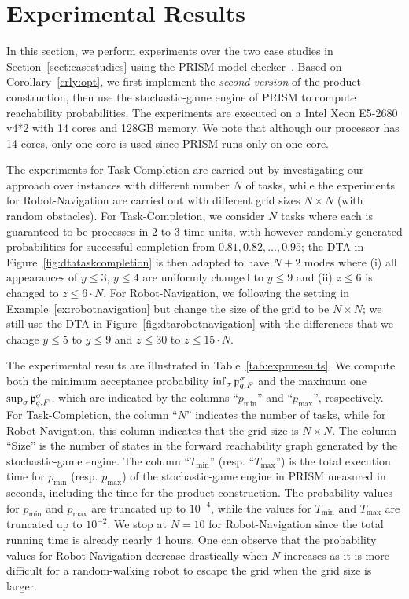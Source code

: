 \vspace{-1.2em}
\section{Experimental Results}
\vspace{-1em}
In this section, we perform experiments over the two case studies in Section~\ref{sect:casestudies} using the PRISM model checker~\cite{DBLP:conf/cav/KwiatkowskaNP11}.
Based on Corollary~\ref{crly:opt}, we first implement the \emph{second version} of the product construction, then use the stochastic-game engine of PRISM to compute reachability probabilities.
The experiments are executed on a Intel Xeon E5-2680 v4*2 with 14 cores and 128GB memory.
We note that although our processor has 14 cores, only one core is used since PRISM runs only on one core.

The experiments for Task-Completion are carried out by investigating our approach over instances with different number $N$ of tasks, while the experiments for Robot-Navigation are carried out with different grid sizes $N\times N$ (with random obstacles).
For Task-Completion, we consider $N$ tasks where each is guaranteed to be processes in $2$ to $3$ time units, with however randomly generated probabilities for successful completion from $0.81,0.82,\dots,0.95$; the DTA in Figure~\ref{fig:dtataskcompletion} is then adapted to have $N+2$ modes where (i) all appearances of $y\le 3$, $y\le 4$ are uniformly changed to $y\le 9$ and (ii) $z\le 6$ is changed to $z\le 6\cdot N$.
For Robot-Navigation, we following the setting in Example~\ref{ex:robotnavigation} but change the size of the grid to be $N\times N$; we still use the DTA in Figure~\ref{fig:dtarobotnavigation} with the differences that we change $y\le 5$ to $y\le 9$ and $z\le 30$ to $z\le 15\cdot N$.

The experimental results are illustrated in Table~\ref{tab:expmresults}.
We compute both the minimum acceptance probability  $\inf_\sigma \mathfrak{p}_{q,F}^{\sigma}$ and the maximum one $\sup_\sigma  \mathfrak{p}_{q,F}^{\sigma}$, which are indicated by the columns ``$p_{\min}$'' and ``$p_{\max}$'', respectively.
For Task-Completion, the column ``$N$'' indicates the number of tasks, while for Robot-Navigation, this column indicates that the grid size is $N\times N$. The column ``Size'' is the number of states in the forward reachability graph generated by the stochastic-game engine. The column ``$T_{\min}$'' (resp. ``$T_{\max}$'') is the total execution time for $p_{\min}$ (resp. $p_{\max}$) of the stochastic-game engine in PRISM measured in seconds, including the time for the product construction.
The probability values for $p_{\min}$ and $p_{\max}$ are truncated up to $10^{-4}$, while the values for $T_{\min}$ and $T_{\max}$ are truncated up to $10^{-2}$.
We stop at $N=10$ for Robot-Navigation since the total running time is already nearly 4 hours.
One can observe that the probability values for Robot-Navigation decrease drastically when $N$ increases as it is more difficult for a random-walking robot to escape the grid when the grid size is larger.

